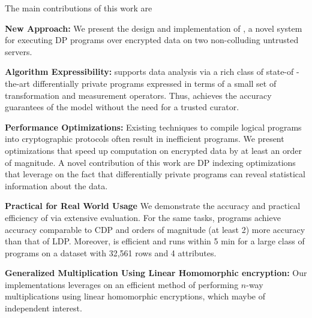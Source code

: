 The main contributions of this work are
\squishlist
\item \textbf{New Approach:} We present the design and implementation of \system, a novel system for executing DP programs over encrypted data on two non-colluding untrusted servers. %
\item \textbf{Algorithm Expressibility:} \system supports data analysis via a rich class of state-of -the-art differentially private programs expressed in terms of a small set of transformation and measurement operators. Thus, \system achieves the accuracy guarantees of the \cdp model without the need for a trusted curator.  
\item \textbf{Performance Optimizations:} Existing techniques to compile logical \system programs into cryptographic protocols often result in inefficient programs. We present optimizations that speed up computation on encrypted data by at least an order of magnitude. A novel contribution of this work are DP indexing optimizations that leverage on the fact that differentially private programs can reveal statistical information about the data. 
\item \textbf{Practical for Real World Usage} We demonstrate the accuracy and practical efficiency of \system via extensive  evaluation. For the same tasks, \system programs achieve accuracy comparable to \textsf{CDP} and orders of magnitude (at least 2) more accuracy than that of \textsf{LDP}. Moreover, \system is efficient and runs within 5 min for a large class of programs on a dataset with 32,561 rows and 4 attributes. 
\item \textbf{Generalized Multiplication Using Linear Homomorphic encryption:} Our implementations leverages on an efficient method of performing $n$-way multiplications using linear homomorphic encryptions, which maybe of independent interest.
\squishend
